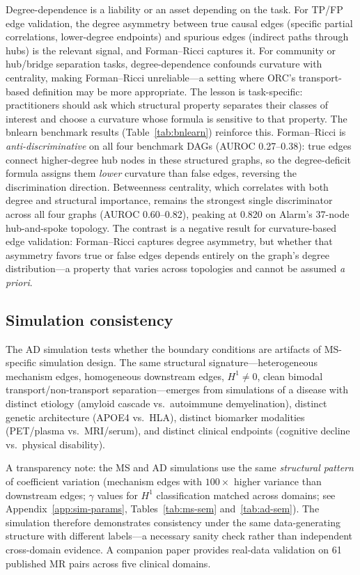 \documentclass[11pt]{article}
\begin{document}
Degree-dependence is a liability or an asset depending on the task.
For TP/FP edge validation, the degree asymmetry between true causal edges (specific partial correlations, lower-degree endpoints) and spurious edges (indirect paths through hubs) is the relevant signal, and Forman--Ricci captures it.
For community or hub/bridge separation tasks, degree-dependence confounds curvature with centrality, making Forman--Ricci unreliable---a setting where ORC's transport-based definition may be more appropriate.
The lesson is task-specific: practitioners should ask which structural property separates their classes of interest and choose a curvature whose formula is sensitive to that property.
The bnlearn benchmark results (Table~\ref{tab:bnlearn}) reinforce this.
Forman--Ricci is \emph{anti-discriminative} on all four benchmark DAGs (AUROC 0.27--0.38): true edges connect higher-degree hub nodes in these structured graphs, so the degree-deficit formula assigns them \emph{lower} curvature than false edges, reversing the discrimination direction.
Betweenness centrality, which correlates with both degree and structural importance, remains the strongest single discriminator across all four graphs (AUROC 0.60--0.82), peaking at 0.820 on Alarm's 37-node hub-and-spoke topology.
The contrast is a negative result for curvature-based edge validation: Forman--Ricci captures degree asymmetry, but whether that asymmetry favors true or false edges depends entirely on the graph's degree distribution---a property that varies across topologies and cannot be assumed \emph{a priori}.

\subsection{Simulation consistency}

The AD simulation tests whether the boundary conditions are artifacts of MS-specific simulation design.
The same structural signature---heterogeneous mechanism edges, homogeneous downstream edges, $H^1 \neq 0$, clean bimodal transport/non-transport separation---emerges from simulations of a disease with distinct etiology (amyloid cascade vs.\ autoimmune demyelination), distinct genetic architecture (APOE4 vs.\ HLA), distinct biomarker modalities (PET/plasma vs.\ MRI/serum), and distinct clinical endpoints (cognitive decline vs.\ physical disability).

A transparency note: the MS and AD simulations use the same \emph{structural pattern} of coefficient variation (mechanism edges with $100\times$ higher variance than downstream edges; $\gamma$ values for $H^1$ classification matched across domains; see Appendix~\ref{app:sim-params}, Tables~\ref{tab:ms-sem} and~\ref{tab:ad-sem}).
The simulation therefore demonstrates consistency under the same data-generating structure with different labels---a necessary sanity check rather than independent cross-domain evidence. A companion paper \citep{tower2026sheaf} provides real-data validation on 61 published MR pairs across five clinical domains.
\end{document}
